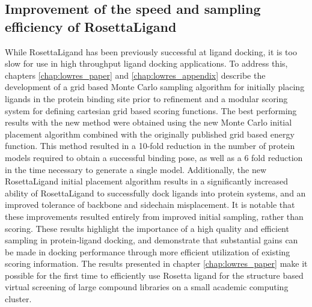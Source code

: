 \subsection{Improvement of the speed and sampling efficiency of RosettaLigand}
While RosettaLigand has been previously successful at ligand docking\citep{Lemmon:2012ku,Combs:2011db,Allison:2013ir}, it is too slow for use in high throughput ligand docking applications.
To address this, chapters \ref{chap:lowres_paper} and \ref{chap:lowres_appendix} describe the development of a grid based Monte Carlo sampling algorithm for initially placing ligands in the protein binding site prior to refinement and a modular scoring system for defining cartesian grid based scoring functions.
The best performing results with the new method were obtained using the new Monte Carlo initial placement algorithm combined with the originally published grid based energy function.
This method resulted in a 10-fold reduction in the number of protein models required to obtain a successful binding pose, as well as a 6 fold reduction in the time necessary to generate a single model.
Additionally, the new RosettaLigand initial placement algorithm results in a significantly increased ability of RosettaLigand to successfully dock ligands into protein systems, and an improved tolerance of backbone and sidechain misplacement.
It is notable that these improvements resulted entirely from improved initial sampling, rather than scoring.
These results highlight the importance of a high quality and efficient sampling in protein-ligand docking, and demonstrate that substantial gains can be made in docking performance through more efficient utilization of existing scoring information.
The results presented in chapter \ref{chap:lowres_paper} make it possible for the first time to efficiently use Rosetta ligand for the structure based virtual screening of large compound libraries on a small academic computing cluster.

